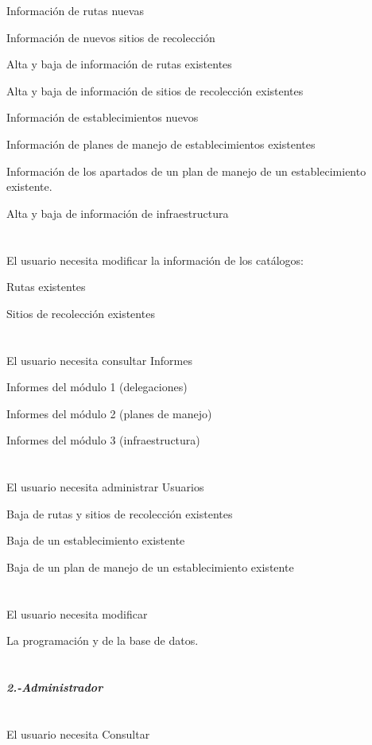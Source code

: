 \textbullet Información de rutas nuevas

\textbullet Información de nuevos sitios de recolección

\textbullet Alta y baja de información de rutas existentes

\textbullet Alta y baja de información de sitios de recolección existentes

\textbullet Información de establecimientos nuevos

\textbullet Información de planes de manejo de establecimientos existentes

\textbullet Información de los apartados de un plan de manejo de un establecimiento existente.

\textbullet Alta y baja de información de infraestructura\\\\\\
\textbullet El usuario necesita modificar  la información de los catálogos:

\textbullet Rutas existentes

\textbullet Sitios de recolección existentes\\\\\\
\textbullet El usuario necesita consultar Informes

\textbullet Informes del módulo 1 (delegaciones)

\textbullet Informes del módulo 2 (planes de manejo)

\textbullet Informes del módulo 3 (infraestructura)\\\\\\
\textbullet El usuario necesita administrar
Usuarios

\textbullet Baja de rutas y sitios de recolección existentes

\textbullet Baja de un establecimiento existente

\textbullet Baja de un plan de manejo de un establecimiento existente\\\\\\
\textbullet El usuario necesita modificar

\textbullet La programación y de la base de datos.\\\\\\
{\large \textit{\textbf{2.-Administrador}}}\\\\\\
\textbullet El usuario necesita Consultar \\

